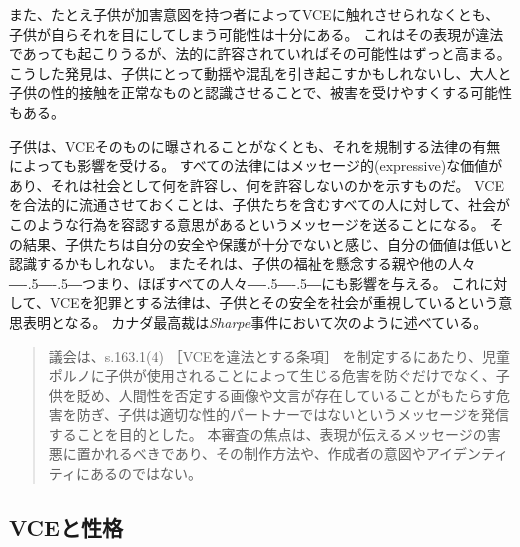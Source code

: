 \documentclass[paper=a4,book,openany]{jlreq}
\def\DDASH{―\kern-.5\zw―\kern-.5\zw―} %
\begin{document}
また、たとえ子供が加害意図を持つ者によってVCEに触れさせられなくとも、子供が自らそれを目にしてしまう可能性は十分にある。
これはその表現が違法であっても起こりうるが、法的に許容されていればその可能性はずっと高まる。
こうした発見は、子供にとって動揺や混乱を引き起こすかもしれないし、大人と子供の性的接触を正常なものと認識させることで、被害を受けやすくする可能性もある。

子供は、VCEそのものに曝されることがなくとも、それを規制する法律の有無によっても影響を受ける。
すべての法律にはメッセージ的(expressive)な価値があり、それは社会として何を許容し、何を許容しないのかを示すものだ。
VCEを合法的に流通させておくことは、子供たちを含むすべての人に対して、社会がこのような行為を容認する意思があるというメッセージを送ることになる。
その結果、子供たちは自分の安全や保護が十分でないと感じ、自分の価値は低いと認識するかもしれない。
またそれは、子供の福祉を懸念する親や他の人々{\DDASH}つまり、ほぼすべての人々{\DDASH}にも影響を与える。
これに対して、VCEを犯罪とする法律は、子供とその安全を社会が重視しているという意思表明となる。
カナダ最高裁は\emph{Sharpe}事件において次のように述べている。

\begin{quote}
議会は、s.163.1(4) ［VCEを違法とする条項］ を制定するにあたり、児童ポルノに子供が使用されることによって生じる危害を防ぐだけでなく、子供を貶め、人間性を否定する画像や文言が存在していることがもたらす危害を防ぎ、子供は適切な性的パートナーではないというメッセージを発信することを目的とした。
本審査の焦点は、表現が伝えるメッセージの害悪に置かれるべきであり、その制作方法や、作成者の意図やアイデンティティにあるのではない。
\end{quote}

\subsection{VCEと性格}
\end{document}
